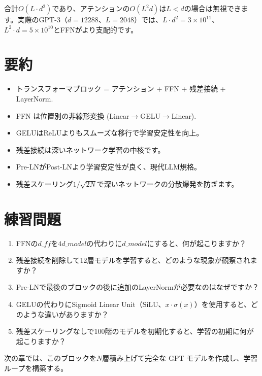 合計$O(L \cdot d^2)$であり、アテンションの$O(L^2 d)$は$L < d$の場合は無視できます。実際のGPT-3（$d = 12288$、$L = 2048$）では、$L \cdot d^2 = 3 \times 10^{11}$、$L^2 \cdot d = 5 \times 10^{10}$とFFNがより支配的です。

\section{要約}

\begin{itemize}
\item トランスフォーマブロック = アテンション + FFN + 残差接続 + LayerNorm.
\item FFN は位置別の非線形変換 (Linear$\to$GELU$\to$Linear).
\item GELUはReLUよりもスムーズな移行で学習安定性を向上。
\item 残差接続は深いネットワーク学習の中核です。
\item Pre-LNがPost-LNより学習安定性が良く、現代LLM規格。
\item 残差スケーリング$1/\sqrt{2N}$で深いネットワークの分散爆発を防ぎます。
\end{itemize}

\section{練習問題}

\begin{enumerate}
\item FFNの$d\_{ff}$を$4d\_{model}$の代わりに$d\_{model}$にすると、何が起こりますか？
\item 残差接続を削除して12層モデルを学習すると、どのような現象が観察されますか？
\item Pre-LNで最後のブロックの後に追加のLayerNormが必要なのはなぜですか？
\item GELUの代わりにSigmoid Linear Unit（SiLU、$x \cdot \sigma(x)$）を使用すると、どのような違いがありますか？
\item 残差スケーリングなしで100階のモデルを初期化すると、学習の初期に何が起こりますか？
\end{enumerate}

次の章では、このブロックを$N$層積み上げて完全な GPT モデルを作成し、学習ループを構築する。
